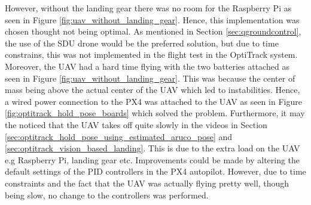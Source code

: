 \documentclass[../Head/report.tex]{subfiles}
\begin{document}
However, without the landing gear there was no room for the Raspberry Pi as seen in Figure \ref{fig:uav_without_landing_gear}. Hence, this implementation was chosen thought not being optimal. As mentioned in Section \ref{sec:qgroundcontrol}, the use of the SDU drone would be the preferred solution, but due to time constrains, this was not implemented in the flight test in the OptiTrack system. Moreover, the UAV had a hard time flying with the two batteries attached as seen in Figure \ref{fig:uav_without_landing_gear}. This was because the center of mass being above the actual center of the UAV which led to instabilities. Hence, a wired power connection to the PX4 was attached to the UAV as seen in Figure \ref{fig:optitrack_hold_pose_boards} which solved the problem. Furthermore, it may the noticed that the UAV takes off quite slowly in the videos in Section \ref{sec:optitrack_hold_pose_using_estimated_aruco_pose} and \ref{sec:optitrack_vision_based_landing}. This is due to the extra load on the UAV e.g Raspberry Pi, landing gear etc. Improvements could be made by altering the default settings of the PID controllers in the PX4 autopilot. However, due to time constraints and the fact that the UAV was actually flying pretty well, though being slow, no change to the controllers was performed.  
\end{document}
